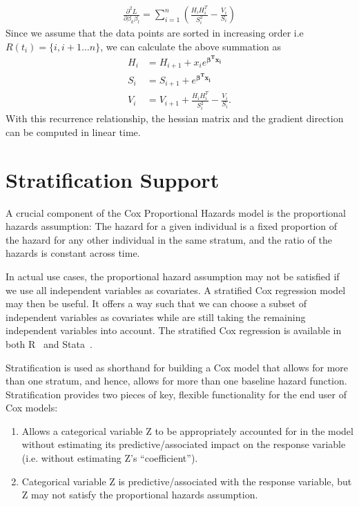 \begin{align}
\frac{\partial^2 L}{\partial \beta_k \beta_l} = \sum_{i = 1}^n \left( \frac{H_{i}H_{i}^T }{ S_{i}^2 } -  \frac{V_{i}}{ S_{i} } \right)
\end{align}
Since we assume that the data points are sorted in increasing order i.e
$R(t_i) = \{i, i+1 \ldots n \}$, we can calculate the above summation as
\begin{align}
H_{i}& =   H_{i+1} +  x_{i} e^{\mathbf{\beta^T x_i}} \label{eq:numerator_avg}\\
S_i & = S_{i+1} + e^{\mathbf{\beta^T x_i}} \label{eq:denominator_avg}\\
V_i & = V_{i+1} +  \frac{H_{i}H_{i}^T }{ S_{i}^2 } -  \frac{V_{i}}{
  S_{i}} \label{eq:hessian}.
\end{align}
With this recurrence relationship, the hessian matrix and the gradient direction
can be computed in linear time.


\section{Stratification Support}\label{cox:stratified}
A crucial component of the Cox Proportional Hazards model is the proportional hazards assumption:
The hazard for a given individual is a fixed proportion of the hazard for any
other individual in the same stratum, and the ratio of the hazards is constant
across time.

In actual use cases, the proportional hazard assumption may not be satisfied if
we use all independent variables as covariates. A stratified Cox regression
model may then be useful. It offers a way such that we can choose a subset of
independent variables as covariates while are still taking the remaining
independent variables into account. The stratified Cox regression is available
in both R~\cite{rcox} and Stata~\cite{statacox}.

Stratification is used as shorthand for building a Cox model that allows for
more than one stratum, and hence, allows for more than one baseline hazard
function.  Stratification provides two pieces of key, flexible functionality for
the end user of Cox models:
\begin{enumerate}
    \item Allows a categorical variable Z to be appropriately accounted for in
    the model without estimating its predictive/associated impact on the
    response variable (i.e. without estimating Z's ``coefficient'').
    \item Categorical variable Z is predictive/associated with the response
    variable, but Z may not satisfy the proportional hazards assumption.
\end{enumerate}

